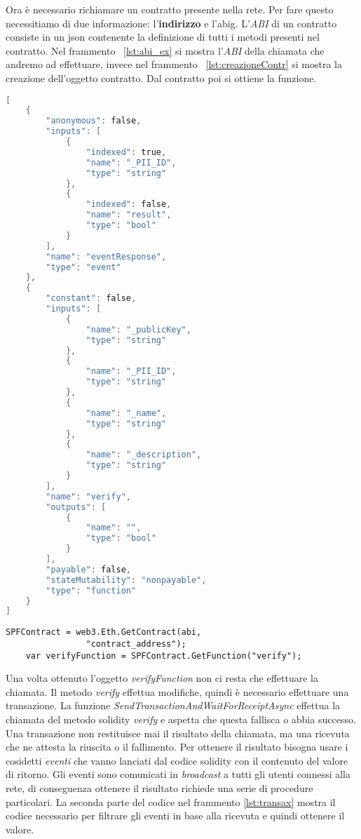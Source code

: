 Ora è necessario richiamare un contratto presente nella rete. Per fare questo necessitiamo di due informazione: l'\textbf{indirizzo} e l'\gls{abig}\glsfirstoccur. L'\emph{ABI} di un contratto consiste in un json contenente la definizione di tutti i metodi presenti nel contratto. Nel frammento ~\ref{lst:abi_ex} si mostra l'\emph{ABI} della chiamata che andremo ad effettuare, invece nel frammento ~\ref{lst:creazioneContr} si mostra la creazione dell'oggetto contratto. Dal contratto poi si ottiene la funzione.

\begin{lstlisting}[caption={Esempio di ABI},label={lst:abi_ex},language={C}]
[
    {
        "anonymous": false,
        "inputs": [
            {
                "indexed": true,
                "name": "_PII_ID",
                "type": "string"
            },
            {
                "indexed": false,
                "name": "result",
                "type": "bool"
            }
        ],
        "name": "eventResponse",
        "type": "event"
    },
    {
        "constant": false,
        "inputs": [
            {
                "name": "_publicKey",
                "type": "string"
            },
            {
                "name": "_PII_ID",
                "type": "string"
            },
            {
                "name": "_name",
                "type": "string"
            },
            {
                "name": "_description",
                "type": "string"
            }
        ],
        "name": "verify",
        "outputs": [
            {
                "name": "",
                "type": "bool"
            }
        ],
        "payable": false,
        "stateMutability": "nonpayable",
        "type": "function"
    }
]  
\end{lstlisting}

\begin{lstlisting}[caption={Creazione del contratto},label={lst:creazioneContr},language={[Sharp]C}]
    SPFContract = web3.Eth.GetContract(abi,
                "contract_address");
    var verifyFunction = SPFContract.GetFunction("verify");
\end{lstlisting}

Una volta ottenuto l'oggetto \emph{verifyFunction} non ci resta che effettuare la chiamata. Il metodo \emph{verify} effettua modifiche, quindi è necessario effettuare una transazione. La funzione \emph{SendTransactionAndWaitForReceiptAsync} effettua la chiamata del metodo solidity \emph{verify} e aspetta che questa fallisca o abbia successo. Una transazione non restituisce mai il risultato della chiamata, ma una ricevuta che ne attesta la riuscita o il fallimento. Per ottenere il risultato bisogna usare i cosidetti \emph{eventi} che vanno lanciati dal codice solidity con il contenuto del valore di ritorno. Gli eventi sono comunicati in \emph{broadcast} a tutti gli utenti connessi alla rete, di conseguenza ottenere il risultato richiede una serie di procedure particolari. La seconda parte del codice nel frammento  \ref{lst:transax} mostra il codice necessario per filtrare gli eventi in base alla ricevuta e quindi ottenere il valore. 


